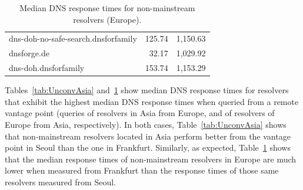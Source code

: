\begin{table}[t!]
\begin{minipage}{1.25\linewidth}
{\begin{scriptsize}
\begin{tabular}{l|rr}
dns-doh-no-safe-search.dnsforfamily         & 125.74 & 1,150.63                         \\
dnsforge.de                                 & 32.17 & 1,029.92                         \\
dns-doh.dnsforfamily                        & 153.74 & 1,153.29                         \\
\bottomrule
\end{tabular}
\end{scriptsize}
    \caption{Median DNS response times for non-mainstream resolvers (Europe).}
\label{tab:UnconvEur}
}
\end{minipage}
\end{table}

Tables~\ref{tab:UnconvAsia} and~\ref{tab:UnconvEur} show median DNS response
times for resolvers that exhibit the highest median DNS response times when
queried from a remote vantage point (queries of resolvers in Asia from Europe,
and of resolvers of Europe from Asia, respectively). In both cases, 
Table~\ref{tab:UnconvAsia} shows that non-mainstream resolvers located
in Asia perform better from the vantage point in Seoul than the one in
Frankfurt.  Similarly, as expected, Table~\ref{tab:UnconvEur} shows that the
median response times of non-mainstream resolvers in Europe are much lower when
measured from Frankfurt than the response times of those same resolvers
measured from Seoul.

